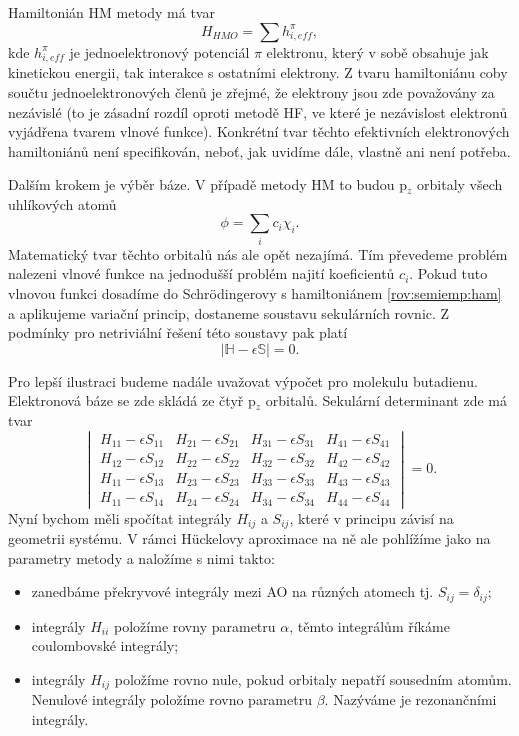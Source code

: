 Hamiltonián HM metody má tvar
\begin{equation}
H_{HMO}= \sum h_{i, eff}^\pi,
\label{rov:semiemp:ham}
\end{equation}
kde $h_{i, eff}^\pi$ je jednoelektronový potenciál $\pi$ elektronu, který v sobě obsahuje jak kinetickou energii, tak interakce s ostatními elektrony.
Z tvaru hamiltoniánu coby součtu jednoelektronových členů je zřejmé, že elektrony jsou zde považovány za nezávislé (to je zásadní rozdíl oproti metodě HF, ve které je nezávislost elektronů vyjádřena  tvarem vlnové funkce). 
Konkrétní tvar těchto efektivních elektronových hamiltoniánů není specifikován, neboť, jak uvidíme dále, vlastně ani není potřeba. 

Dalším krokem je výběr báze. V případě metody HM to budou p$_z$ orbitaly všech uhlíkových atomů
\begin{equation}
\phi= \sum_i c_i \chi_i.
\label{rov:HM_MO}
\end{equation}
Matematický tvar těchto orbitalů nás ale opět nezajímá. Tím převedeme problém nalezeni vlnové funkce na jednodušší problém najití koeficientů $c_i$. Pokud tuto vlnovou funkci dosadíme do Schr\"{o}dingerovy s hamiltoniánem \eqref{rov:semiemp:ham} a aplikujeme variační princip, dostaneme soustavu sekulárních rovnic. Z podmínky pro netriviální řešení této soustavy pak platí
\begin{equation}
|\mathbb{H}-\epsilon \mathbb{S}|=0 .
\label{rov:HM_det}
\end{equation}

Pro lepší ilustraci budeme nadále uvažovat výpočet pro molekulu butadienu.
Elektronová báze se zde skládá ze čtyř p$_z$ orbitalů. Sekulární determinant zde má tvar
\begin{equation}
\begin{vmatrix}
H_{11}-\epsilon S_{11} & H_{21}-\epsilon S_{21} & H_{31}-\epsilon S_{31} & H_{41}-\epsilon S_{41}  \\
H_{12}-\epsilon S_{12} & H_{22}-\epsilon S_{22} & H_{32}-\epsilon S_{32} & H_{42}-\epsilon S_{42}  \\
H_{11}-\epsilon S_{13} & H_{23}-\epsilon S_{23} & H_{33}-\epsilon S_{33} & H_{43}-\epsilon S_{43}  \\
H_{11}-\epsilon S_{14} & H_{24}-\epsilon S_{24} & H_{34}-\epsilon S_{34} & H_{44}-\epsilon S_{44}
\end{vmatrix}
= 0 .
\end{equation}
Nyní bychom měli spočítat integrály $H_{ij}$ a $S_{ij}$, které v principu závisí na geometrii systému.
V rámci H\"{u}ckelovy aproximace na ně ale pohlížíme jako na parametry metody
a naložíme s nimi takto:
\begin{itemize}
\item zanedbáme překryvové integrály mezi AO na různých atomech tj. $S_{ij}=\delta_{ij}$;
\item integrály $H_{ii}$ položíme rovny parametru $\alpha$, těmto integrálům říkáme coulombovské integrály;
\item integrály $H_{ij}$ položíme rovno nule, pokud orbitaly nepatří sousedním atomům.
Nenulové integrály položíme rovno parametru $\beta$. Nazýváme je rezonančními integrály.
\end{itemize}

